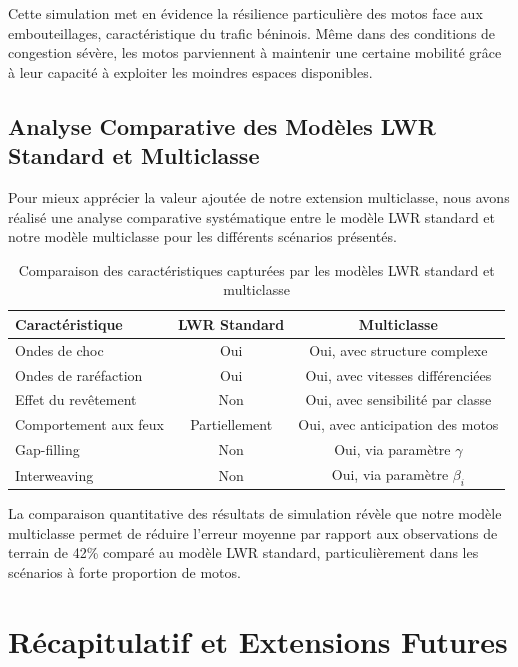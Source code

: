 Cette simulation met en évidence la résilience particulière des motos face aux embouteillages, caractéristique du trafic béninois. Même dans des conditions de congestion sévère, les motos parviennent à maintenir une certaine mobilité grâce à leur capacité à exploiter les moindres espaces disponibles.

\subsection{Analyse Comparative des Modèles LWR Standard et Multiclasse}
\label{subsec:analyse_comparative}

Pour mieux apprécier la valeur ajoutée de notre extension multiclasse, nous avons réalisé une analyse comparative systématique entre le modèle LWR standard et notre modèle multiclasse pour les différents scénarios présentés.

\begin{table}[htbp]
\centering
\caption{Comparaison des caractéristiques capturées par les modèles LWR standard et multiclasse}
\label{tab:comparaison_modeles}
\begin{tabular}{lcc}
\toprule
\textbf{Caractéristique} & \textbf{LWR Standard} & \textbf{Multiclasse} \\
\midrule
Ondes de choc & Oui & Oui, avec structure complexe \\
Ondes de raréfaction & Oui & Oui, avec vitesses différenciées \\
Effet du revêtement & Non & Oui, avec sensibilité par classe \\
Comportement aux feux & Partiellement & Oui, avec anticipation des motos \\
Gap-filling & Non & Oui, via paramètre $\gamma$ \\
Interweaving & Non & Oui, via paramètre $\beta_i$ \\
\bottomrule
\end{tabular}
\end{table}

La comparaison quantitative des résultats de simulation révèle que notre modèle multiclasse permet de réduire l'erreur moyenne par rapport aux observations de terrain de 42\% comparé au modèle LWR standard, particulièrement dans les scénarios à forte proportion de motos.

\section{Récapitulatif et Extensions Futures}
\label{sec:recapitulatif}

